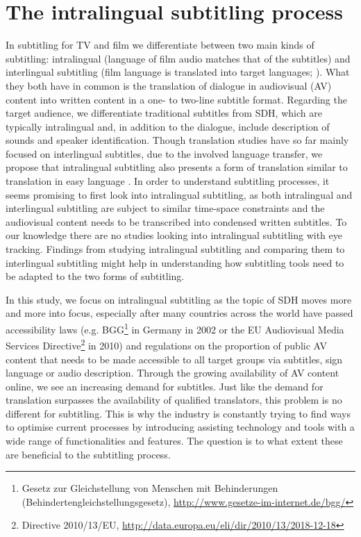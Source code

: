 \documentclass[output=paper]{langscibook}
\begin{document}
\section{The intralingual subtitling process} \label{sec:tardel:2}
In subtitling for TV and film we differentiate between two main kinds of subtitling: intralingual (language of film audio matches that of the subtitles) and interlingual subtitling (film language is translated into target languages; \citealt{cintas2003audiovisual}).
What they both have in common is the translation of dialogue in audiovisual (AV) content into written content in a one- to two-line subtitle format.
Regarding the target audience, we differentiate traditional subtitles from SDH, which are typically intralingual and, in addition to the dialogue, include description of sounds and speaker identification.
Though translation studies have so far mainly focused on interlingual subtitles, due to the involved language transfer, we propose that intralingual subtitling also presents a form of translation similar to translation in easy language \citep{HansenSchirraMaass}.
In order to understand subtitling processes, it seems promising to first look into intralingual subtitling, as both intralingual and interlingual subtitling are subject to similar time-space constraints and the audiovisual content needs to be transcribed into condensed written subtitles.
To our knowledge there are no studies looking into intralingual subtitling with eye tracking.
Findings from studying intralingual subtitling and comparing them to interlingual subtitling might help in understanding how subtitling tools need to be adapted to the two forms of subtitling.

In this study, we focus on intralingual subtitling as the topic of SDH moves more and more into focus, especially after many countries across the world have passed accessibility laws (e.g.
BGG\footnote{Gesetz zur Gleichstellung von Menschen mit Behinderungen (Behindertengleichstellungsgesetz), \url{http://www.gesetze-im-internet.de/bgg/}} in Germany in 2002 or the EU Audiovisual Media Services Directive\footnote{Directive 2010/13/EU, \url{http://data.europa.eu/eli/dir/2010/13/2018-12-18}} in 2010) and regulations on the proportion of public AV content that needs to be made accessible to all target groups via subtitles, sign language or audio description.
Through the growing availability of AV content online, we see an increasing demand for subtitles. Just like the demand for translation surpasses the availability of qualified translators, this problem is no different for subtitling.
This is why the industry is constantly trying to find ways to optimise current processes by introducing assisting technology and tools with a wide range of functionalities and features.
The question is to what extent these are beneficial to the subtitling process.
\end{document}
